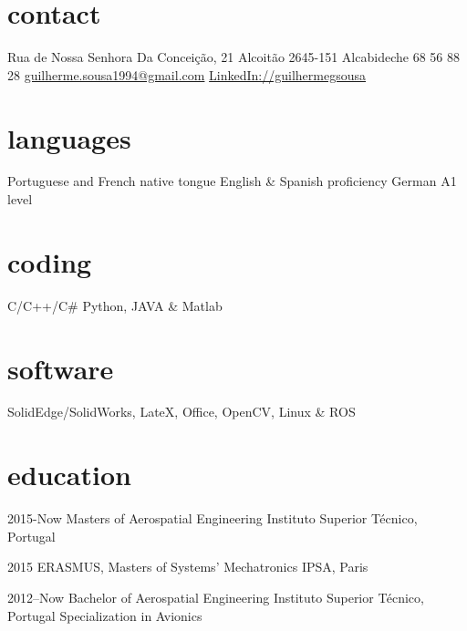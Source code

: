 \documentclass[]{friggeri-cv} %
\begin{document}


\begin{aside} %
\section{contact}
Rua de Nossa Senhora Da Conceição, 21
Alcoitão
2645-151 Alcabideche 68 56 88 28\newline
\href{mailto:guilherme.sousa1994@gmail.com}{guilherme.sousa1994\newline @gmail.com}
\href{https://www.linkedin.com/in/guilhermegsousa}{LinkedIn://guilhermegsousa}
\section{languages}
Portuguese and French native tongue
English \& Spanish proficiency
German A1 level
\section{coding}
C/C++/C\#
Python,
JAVA \& Matlab
\section{software}
SolidEdge/SolidWorks,
LateX, Office,
OpenCV,
Linux \& ROS
\end{aside}


\section{education}

\begin{entrylist}


\entry
{2015-Now}
{Masters {\normalfont of Aerospatial Engineering}}
{Instituto Superior Técnico, Portugal}
{\emph{} \\ }%


\entry
{2015}
{ERASMUS, Masters {\normalfont of Systems' Mechatronics} }
{IPSA, Paris}
{\emph{} \\ }

\entry
{2012--Now}
{Bachelor {\normalfont of Aerospatial Engineering}}
{Instituto Superior Técnico, Portugal}
{Specialization in Avionics}


\end{entrylist}
\end{document}
